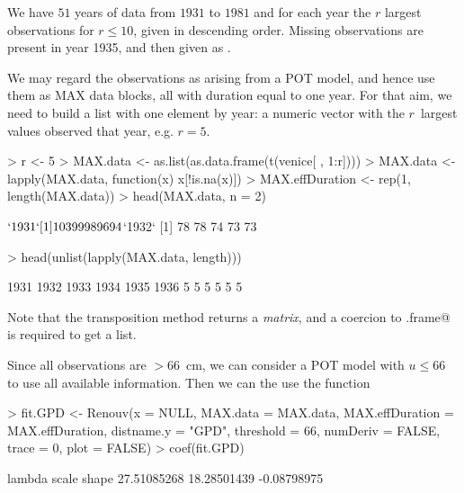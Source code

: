 \documentclass[a4paper]{report}
\begin{document}
\noindent
We have $51$ years of data from
$1931$ to
$1981$ and for each year the $r$
largest observations for $r \leqslant 10$, given in descending
order. Missing observations are present in year 1935, and then given
as \verb@NA@.

We may regard the observations as arising from a POT model, and
hence use them as MAX data blocks, all with duration equal to one
year.  For that aim, we need to build a list with one element by year:
a numeric vector with the $r$~largest values observed that year,
e.g. $r=5$.

\begin{Schunk}
\begin{Sinput}
> r <- 5
> MAX.data <- as.list(as.data.frame(t(venice[ , 1:r])))
> MAX.data <- lapply(MAX.data, function(x) x[!is.na(x)])
> MAX.effDuration <- rep(1, length(MAX.data))
> head(MAX.data, n = 2)
\end{Sinput}
\begin{Soutput}
$`1931`
[1] 103  99  98  96  94

$`1932`
[1] 78 78 74 73 73
\end{Soutput}
\begin{Sinput}
> head(unlist(lapply(MAX.data, length)))
\end{Sinput}
\begin{Soutput}
1931 1932 1933 1934 1935 1936 
   5    5    5    5    5    5 
\end{Soutput}
\end{Schunk}

\noindent
Note that the transposition method \verb@t@ returns a \textit{matrix},
and a coercion to \verb@data.frame@ is required to get a list.


Since all observations are $>66$~cm, we can consider a POT model with
$u \leqslant 66$ to use all available information. Then we can the use the
\verb@Renouv@ function

\begin{Schunk}
\begin{Sinput}
> fit.GPD <- Renouv(x = NULL, 
                    MAX.data = MAX.data, MAX.effDuration = MAX.effDuration,
                    distname.y = "GPD", threshold = 66,
                    numDeriv = FALSE, trace = 0, plot = FALSE)
> coef(fit.GPD)
\end{Sinput}
\begin{Soutput}
     lambda       scale       shape 
27.51085268 18.28501439 -0.08798975 
\end{Soutput}
\end{Schunk}
\end{document}
